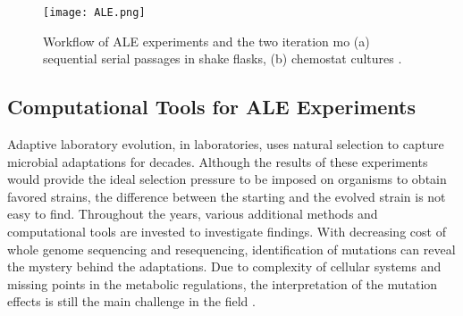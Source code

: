\begin{figure}[H]
\begin{center}
\texttt{[image: ALE.png]}
\caption[Workflow of ALE experiments and the two iteration mo (a) sequential serial passages in shake flasks, (b) chemostat cultures \cite{dragosits2013adaptive, shepelin2018selecting}.]{Workflow of ALE experiments and the two iteration mo (a) sequential serial passages in shake flasks, (b) chemostat cultures \cite{dragosits2013adaptive, shepelin2018selecting}.}
\label{fig:ale}
\end{center}
\end{figure}
\vspace{-1cm}

\subsection{Computational Tools for ALE Experiments}

Adaptive laboratory evolution, in laboratories, uses natural selection to capture microbial adaptations for decades. Although the results of these experiments would provide the ideal selection pressure to be imposed on organisms to obtain favored strains, the difference between the starting and the evolved strain is not easy to find. Throughout the years, various additional methods and computational tools are invested to investigate findings. With decreasing cost of whole genome sequencing and resequencing, identification of mutations can reveal the mystery behind the adaptations. Due to complexity of cellular systems and missing points in the metabolic regulations, the interpretation of the mutation effects is still the main challenge in the field \cite{palsson2011adaptive}.

